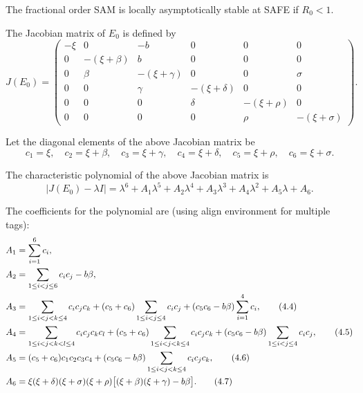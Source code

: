 \documentclass[10pt]{NSP1}
\begin{document}
	\par\medskip{}\smallskip
	
	The fractional order SAM is locally asymptotically stable at SAFE if \(R_{0} < 1\).
	
	\par\vspace{14.0pt}\vspace{14.0pt}
	
	The Jacobian matrix of \(E_{0}\) is defined by
	\[
	J(E_{0}) = \begin{pmatrix}
		-\xi & 0 & -b & 0 & 0 & 0 \\
		0 & -(\xi+\beta) & b & 0 & 0 & 0 \\
		0 & \beta & -(\xi+\gamma) & 0 & 0 & \sigma \\
		0 & 0 & \gamma & -(\xi+\delta) & 0 & 0 \\
		0 & 0 & 0 & \delta & -(\xi+\rho) & 0 \\
		0 & 0 & 0 & 0 & \rho & -(\xi+\sigma)
	\end{pmatrix}. \tag{4.1}
	\]
	
	Let the diagonal elements of the above Jacobian matrix be
	\[
	c_{1}=\xi,\quad c_{2}=\xi+\beta,\quad c_{3}=\xi+\gamma,\quad c_{4}=\xi+\delta,\quad c_{5}=\xi+\rho,\quad c_{6}=\xi+\sigma.
	\]
	
	The characteristic polynomial of the above Jacobian matrix is
	\[
	|J(E_{0}) - \lambda I| = \lambda^{6} + A_{1}\lambda^{5} + A_{2}\lambda^{4} + A_{3}\lambda^{3} + A_{4}\lambda^{2} + A_{5}\lambda + A_{6}. \tag{4.2}
	\]
	
	The coefficients for the polynomial are (using align environment for multiple tags):
	\begin{align}
		A_{1} &= \sum_{i=1}^{6} c_{i}, \notag \\
		A_{2} &= \sum_{1\le i<j\le 6} c_i c_j - b\beta, \notag \\
		A_{3} &= \sum_{1\le i<j<k\le 4} c_i c_j c_k + (c_5+c_6)\sum_{1\le i<j\le 4} c_i c_j + (c_5 c_6 - b\beta)\sum_{i=1}^{4} c_i, \tag{4.4} \\
		A_{4} &= \sum_{1\le i<j<k<l\le 4} c_i c_j c_k c_l + (c_5+c_6)\sum_{1\le i<j<k\le 4} c_i c_j c_k + (c_5 c_6 - b\beta)\sum_{1\le i<j\le 4} c_i c_j, \tag{4.5} \\
		A_{5} &= (c_5+c_6)c_1c_2c_3c_4 + (c_5 c_6 - b\beta)\sum_{1\le i<j<k\le 4} c_i c_j c_k, \tag{4.6} \\
		A_{6} &= \xi(\xi+\delta)(\xi+\sigma)(\xi+\rho)\bigl[(\xi+\beta)(\xi+\gamma) - b\beta\bigr]. \tag{4.7}
	\end{align}
	
\end{document}
